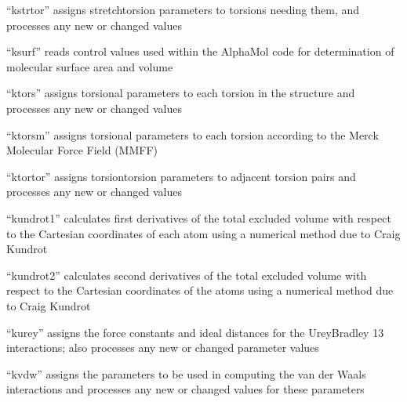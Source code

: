 \documentclass[letterpaper,11pt,english]{sphinxmanual}
\begin{document}
\sphinxAtStartPar
{}

\sphinxAtStartPar
“kstrtor” assigns stretch\sphinxhyphen{}torsion parameters to torsions needing them, and processes any new or changed values

\sphinxAtStartPar
{}

\sphinxAtStartPar
“ksurf” reads control values used within the AlphaMol code for determination of molecular surface area and volume

\sphinxAtStartPar
{}

\sphinxAtStartPar
“ktors” assigns torsional parameters to each torsion in the structure and processes any new or changed values

\sphinxAtStartPar
{}

\sphinxAtStartPar
“ktorsm” assigns torsional parameters to each torsion according to the Merck Molecular Force Field (MMFF)

\sphinxAtStartPar
{}

\sphinxAtStartPar
“ktortor” assigns torsion\sphinxhyphen{}torsion parameters to adjacent torsion pairs and processes any new or changed values

\sphinxAtStartPar
{}

\sphinxAtStartPar
“kundrot1” calculates first derivatives of the total excluded volume with respect to the Cartesian coordinates of each atom using a numerical method due to Craig Kundrot

\sphinxAtStartPar
{}

\sphinxAtStartPar
“kundrot2” calculates second derivatives of the total excluded volume with respect to the Cartesian coordinates of the atoms using a numerical method due to Craig Kundrot

\sphinxAtStartPar
{}

\sphinxAtStartPar
“kurey” assigns the force constants and ideal distances for the Urey\sphinxhyphen{}Bradley 1\sphinxhyphen{}3 interactions; also processes any new or changed parameter values

\sphinxAtStartPar
{}

\sphinxAtStartPar
“kvdw” assigns the parameters to be used in computing the van der Waals interactions and processes any new or changed values for these parameters
\end{document}

